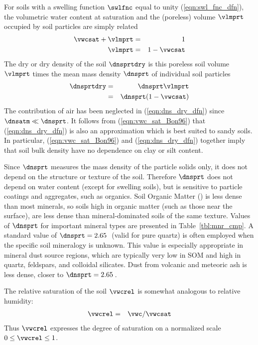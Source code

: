 \documentclass[12pt,twoside]{book}
\begin{document}
For soils with a swelling function $\swlfnc$ equal to unity
(\ref{eqn:swl_fnc_dfn}), the volumetric water content at saturation  
and the (poreless) volume $\vlmprt$ occupied by soil particles are
simply related
\begin{eqnarray}
\vwcsat + \vlmprt & = & 1 \nonumber \\
\vlmprt & = & 1 - \vwcsat
\label{eqn:vlm_soi_dfn}
\end{eqnarray}
The dry  or dry density of the soil $\dnsprtdry$ is
this poreless soil volume $\vlmprt$ times the mean mass density
$\dnsprt$ of individual soil particles 
\begin{eqnarray}
\dnsprtdry & = & \dnsprt \vlmprt \nonumber \\
& = & \dnsprt (1 - \vwcsat)
\label{eqn:dns_dry_dfn}
\end{eqnarray}
The contribution of air has been neglected in (\ref{eqn:dns_dry_dfn})
since $\dnsatm \ll \dnsprt$. 
It follows from (\ref{eqn:vwc_sat_Bon96}) that (\ref{eqn:dns_dry_dfn})
is also an approximation which is best suited to sandy soils. 
In particular, (\ref{eqn:vwc_sat_Bon96}) and (\ref{eqn:dns_dry_dfn})
together imply that soil bulk density have no dependence on clay
or silt content.  

Since $\dnsprt$ measures the mass density of the particle solids only,
it does not depend on the structure or texture of the soil.
Therefore $\dnsprt$ does not depend on water content (except for
swelling soils), but is sensitive to particle coatings and aggregates,
such as organics.
Soil Organic Matter () is less dense than most minerals,
so soils high in organic matter (such as those near the surface), 
are less dense than mineral-dominated soils of the same texture.
Values of $\dnsprt$ for important mineral types are presented in 
Table~\ref{tbl:mnr_cmp}.
A standard value of $\dnsprt = 2.65$\,\gxcmC\ (valid for pure quartz)  
is often employed when the specific soil mineralogy is unknown.
This value is especially appropriate in mineral dust source regions,
which are typically very low in SOM and high in quartz, feldspars, and
colloidal silicates.
Dust from volcanic and meteoric ash is less dense, closer to 
$\dnsprt = 2.65$\,\gxcmC. 

The relative saturation of the soil $\vwcrel$ is somewhat analogous to
relative humidity:
\begin{eqnarray}
\vwcrel & = & \vwc / \vwcsat 
\label{eqn:vwc_rel_dfn}
\end{eqnarray}
Thus $\vwcrel$ expresses the degree of saturation on a normalized
scale $0 \le \vwcrel \le 1$.
\end{document}
